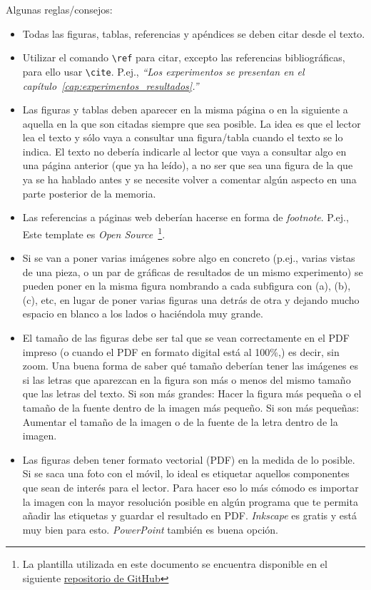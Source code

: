\documentclass[a4paper,11pt,reqno,twoside]{memoir}
\begin{document}
Algunas reglas/consejos: 

\begin{itemize}
    \item Todas las figuras, tablas, referencias y apéndices se deben citar desde el texto.
    \item Utilizar el comando \lstinline{\ref} para citar, excepto las referencias bibliográficas, para ello usar \lstinline{\cite}. P.ej., \textit{``Los experimentos se presentan en el capítulo~\ref{cap:experimentos_resultados}.''}
    \item Las figuras y tablas deben aparecer en la misma página o en la siguiente a aquella en la que son citadas siempre que sea posible. La idea es que el lector lea el texto y sólo vaya a consultar una figura/tabla cuando el texto se lo indica. El texto no debería indicarle al lector que vaya a consultar algo en una página anterior (que ya ha leído), a no ser que sea una figura de la que ya se ha hablado antes y se necesite volver a comentar algún aspecto en una parte posterior de la memoria.
    \item Las referencias a páginas web deberían hacerse en forma de \textit{footnote}. P.ej., Este template es \textit{Open Source}~\footnote{La plantilla utilizada en este documento se encuentra disponible en el siguiente \href{https://github.com/jmgandarias/template_TFE}{repositorio de GitHub}}.
    \item Si se van a poner varias imágenes sobre algo en concreto (p.ej., varias vistas de una pieza, o un par de gráficas de resultados de un mismo experimento) se pueden poner en la misma figura nombrando a cada subfigura con (a), (b), (c), etc, en lugar de poner varias figuras una detrás de otra y dejando mucho espacio en blanco a los lados o haciéndola muy grande.
    \item El tamaño de las figuras debe ser tal que se vean correctamente en el PDF impreso (o cuando el PDF en formato digital está al 100\%,) es decir, sin zoom. Una buena forma de saber qué tamaño deberían tener las imágenes es si las letras que aparezcan en la figura son más o menos del mismo tamaño que las letras del texto. Si son más grandes: Hacer la figura más pequeña o el tamaño de la fuente dentro de la imagen más pequeño. Si son más pequeñas: Aumentar el tamaño de la imagen o de la fuente de la letra dentro de la imagen.
    \item Las figuras deben tener formato vectorial (PDF) en la medida de lo posible. Si se saca una foto con el móvil, lo ideal es etiquetar aquellos componentes que sean de interés para el lector. Para hacer eso lo más cómodo es importar la imagen con la mayor resolución posible en algún programa que te permita añadir las etiquetas y guardar el resultado en PDF. \textit{Inkscape} es gratis y está muy bien para esto. \textit{PowerPoint} también es buena opción. 

\end{itemize}
\end{document}
